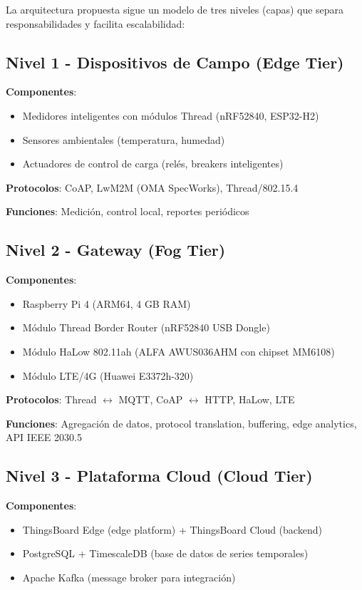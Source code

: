 La arquitectura propuesta sigue un modelo de tres niveles (capas) que separa responsabilidades y facilita escalabilidad:

\subsection{Nivel 1 - Dispositivos de Campo (Edge Tier)}

\textbf{Componentes}:
\begin{itemize}
    \item Medidores inteligentes con módulos Thread (nRF52840, ESP32-H2)
    \item Sensores ambientales (temperatura, humedad)
    \item Actuadores de control de carga (relés, breakers inteligentes)
\end{itemize}

\textbf{Protocolos}: CoAP, LwM2M (OMA SpecWorks), Thread/802.15.4

\textbf{Funciones}: Medición, control local, reportes periódicos

\subsection{Nivel 2 - Gateway (Fog Tier)}

\textbf{Componentes}:
\begin{itemize}
    \item Raspberry Pi 4 (ARM64, 4 GB RAM)
    \item Módulo Thread Border Router (nRF52840 USB Dongle)
    \item Módulo HaLow 802.11ah (ALFA AWUS036AHM con chipset MM6108)
    \item Módulo LTE/4G (Huawei E3372h-320)
\end{itemize}

\textbf{Protocolos}: Thread $\leftrightarrow$ MQTT, CoAP $\leftrightarrow$ HTTP, HaLow, LTE

\textbf{Funciones}: Agregación de datos, protocol translation, buffering, edge analytics, API IEEE 2030.5

\subsection{Nivel 3 - Plataforma Cloud (Cloud Tier)}

\textbf{Componentes}:
\begin{itemize}
    \item ThingsBoard Edge (edge platform) + ThingsBoard Cloud (backend)
    \item PostgreSQL + TimescaleDB (base de datos de series temporales)
    \item Apache Kafka (message broker para integración)
\end{itemize}

